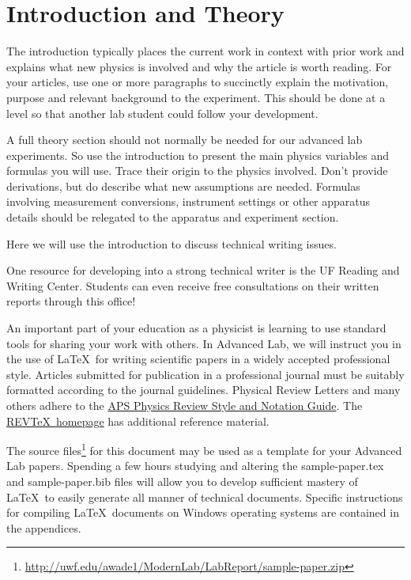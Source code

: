\maketitle


\section{Introduction and Theory}

The introduction typically places
the current work in context with prior work
and explains what new physics is involved
and why the article is worth reading.
For your articles, use one or more paragraphs to
succinctly explain the motivation, purpose and relevant
background to the experiment.
This should be done at a level so that another
lab student could follow your development.

A full theory section should not normally be needed for our advanced lab experiments.
So use the introduction to present the main physics variables and formulas you will use.
Trace their origin to the physics involved.
Don't provide derivations, but do describe
what new assumptions are needed.
Formulas involving measurement conversions, instrument settings
or other apparatus details should be relegated to the apparatus and experiment section.

Here we will use the introduction to discuss technical writing issues. 

One resource for developing into a strong
technical writer is the UF Reading and Writing Center\cite{rwc}.
Students can even receive free consultations 
on their written reports through this office!

An important part of your education as a physicist is learning to
use standard tools for sharing your work with others.
In Advanced Lab, we will instruct you in the use of \LaTeX\ for
writing scientific papers in a widely accepted professional style.
Articles submitted for publication in a professional journal
must be suitably formatted according to the journal guidelines.
Physical Review Letters and many others adhere to the
\href{http://forms.aps.org/author/styleguide.pdf}{APS Physics Review Style and Notation Guide}.
The \href {https://authors.aps.org/revtex4/}{REV\TeX\ homepage}
has additional reference material.

The source files\footnote
{\url{http://uwf.edu/awade1/ModernLab/LabReport/sample-paper.zip}}
for this document may be used as a template for your Advanced Lab papers.
Spending a few hours studying and altering the sample-paper.tex
and sample-paper.bib files will allow you to develop sufficient mastery of \LaTeX\ to easily
generate all manner of technical documents.  Specific instructions
for compiling \LaTeX\ documents on Windows operating systems are
contained in the appendices.

